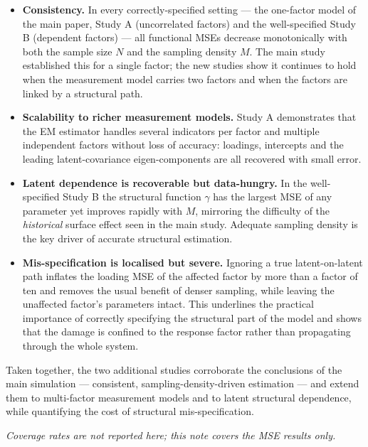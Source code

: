 \documentclass[11pt]{article}
\begin{document}
\begin{itemize}
  \item \textbf{Consistency.} In every correctly-specified setting --- the
  one-factor model of the main paper, Study A (uncorrelated factors) and the
  well-specified Study B (dependent factors) --- all functional MSEs decrease
  monotonically with both the sample size $N$ and the sampling density $M$. The
  main study established this for a single factor; the new studies show it
  continues to hold when the measurement model carries two factors and when the
  factors are linked by a structural path.

  \item \textbf{Scalability to richer measurement models.} Study A demonstrates
  that the EM estimator handles several indicators per factor and multiple
  independent factors without loss of accuracy: loadings, intercepts and the
  leading latent-covariance eigen-components are all recovered with small error.

  \item \textbf{Latent dependence is recoverable but data-hungry.} In the
  well-specified Study B the structural function $\gamma$ has the largest MSE of
  any parameter yet improves rapidly with $M$, mirroring the difficulty of the
  \emph{historical} surface effect seen in the main study. Adequate sampling
  density is the key driver of accurate structural estimation.

  \item \textbf{Mis-specification is localised but severe.} Ignoring a true
  latent-on-latent path inflates the loading MSE of the affected factor by more
  than a factor of ten and removes the usual benefit of denser sampling, while
  leaving the unaffected factor's parameters intact. This underlines the practical
  importance of correctly specifying the structural part of the model and shows
  that the damage is confined to the response factor rather than propagating
  through the whole system.
\end{itemize}

Taken together, the two additional studies corroborate the conclusions of the main
simulation --- consistent, sampling-density-driven estimation --- and extend them
to multi-factor measurement models and to latent structural dependence, while
quantifying the cost of structural mis-specification.

\medskip
\noindent\emph{Coverage rates are not reported here; this note covers the MSE
results only.}
\end{document}
